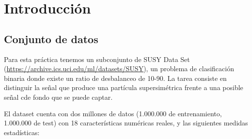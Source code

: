 \section{Introducción}

\subsection{Conjunto de datos}


Para esta práctica tenemos un subconjunto de SUSY Data Set (\url{https://archive.ics.uci.edu/ml/datasets/SUSY}), un problema de clasificación binaria donde existe un ratio de desbalanceo de 10-90. La tarea consiste en distinguir la señal que produce una partícula supersimétrica frente a una posible señal cde fondo que se puede captar.

El dataset cuenta con dos millones de datos (1.000.000 de entrenamiento, 1.000.000 de test) con 18 características numéricas reales, y las siguientes medidas estadísticas:

